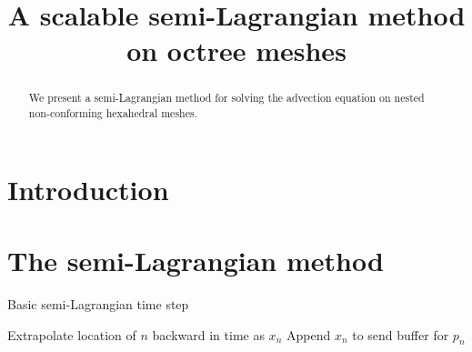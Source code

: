 \documentclass[11pt]{article}
\title{A scalable semi-Lagrangian method on octree meshes}
\author{}
\begin{document}
\maketitle

\begin{abstract}
We present a semi-Lagrangian method for solving the advection equation
on nested non-conforming hexahedral meshes.
\end{abstract}

\section{Introduction}

\section{The semi-Lagrangian method}

\begin{algorithm}
  \caption{Basic semi-Lagrangian time step}
  \begin{algorithmic}
        \STATE Extrapolate location of $n$ backward in time as $x_n$
	\STATE Append $x_n$ to send buffer for $p_n$
	\ENDIF
      \ENDFOR
    \ENDFOR
  \end{algorithmic}
\end{algorithm}
\end{document}

